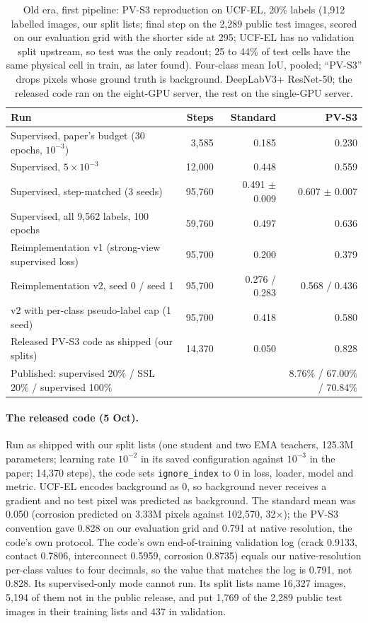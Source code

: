 \begin{table}[htbp]
\centering
\footnotesize
\caption{Old era, first pipeline: PV-S3 reproduction on UCF-EL, 20\% labels (1,912 labelled images, our split lists; final step on the
2,289 public test images, scored on our evaluation grid with the shorter side at 295; UCF-EL has no validation split upstream, so
test was the only readout; 25 to 44\% of test cells have the same physical cell in train, as later found). Four-class mean IoU, pooled; ``PV-S3'' drops pixels
whose ground truth is background. DeepLabV3+ ResNet-50; the released code ran on the eight-GPU server, the rest on the single-GPU
server.}
\label{tab:repro-pvs3}
\begin{tabular}{@{}lrrr@{}}
\toprule
Run & Steps & Standard & PV-S3 \\
\midrule
Supervised, paper's budget (30 epochs, $10^{-3}$) & 3,585 & 0.185 & 0.230 \\
Supervised, $5 \times 10^{-3}$ & 12,000 & 0.448 & 0.559 \\
Supervised, step-matched (3 seeds) & 95,760 & 0.491 $\pm$ 0.009 & 0.607 $\pm$ 0.007 \\
Supervised, all 9,562 labels, 100 epochs & 59,760 & 0.497 & 0.636 \\
Reimplementation v1 (strong-view supervised loss) & 95,700 & 0.200 & 0.379 \\
Reimplementation v2, seed 0 / seed 1 & 95,700 & 0.276 / 0.283 & 0.568 / 0.436 \\
v2 with per-class pseudo-label cap (1 seed) & 95,700 & 0.418 & 0.580 \\
Released PV-S3 code as shipped (our splits) & 14,370 & 0.050 & 0.828 \\
\midrule
Published: supervised 20\% / SSL 20\% / supervised 100\% & & & 8.76\% / 67.00\% / 70.84\% \\
\bottomrule
\end{tabular}
\end{table}

\paragraph{The released code (5 Oct).} Run as shipped with our split lists (one student and two EMA teachers, 125.3M parameters;
learning rate $10^{-2}$ in its saved configuration against $10^{-3}$ in the paper; 14,370 steps), the code sets
\texttt{ignore\_index} to 0 in loss, loader, model and metric. UCF-EL encodes background as 0, so background never receives a gradient
and no test pixel was predicted as background. The standard mean was 0.050 (corrosion predicted on 3.33M pixels against 102,570, 32$\times$);
the PV-S3 convention gave 0.828 on our evaluation grid and 0.791 at native resolution, the code's own protocol. The code's own
end-of-training validation log (crack 0.9133, contact 0.7806, interconnect 0.5959, corrosion 0.8735) equals our native-resolution
per-class values to four decimals, so the value that matches the log is 0.791, not 0.828. Its supervised-only mode cannot run. Its
split lists name 16,327 images, 5,194 of them not in the public release, and put 1,769 of the 2,289 public test images in their
training lists and 437 in validation.

